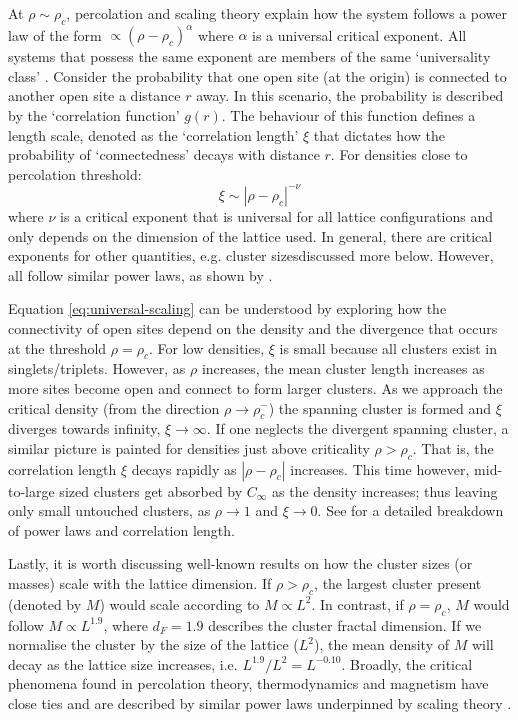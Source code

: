 At $\rho \sim \rho_c$, percolation and scaling theory explain how the system follows a power law of the form $\propto (\rho - \rho_c)^{\alpha}$ 
where $\alpha$ is a universal critical exponent.
All systems that possess the same exponent are members of the same `universality class' \cite{PhysRev.180.594, RevModPhys.76.663}.
Consider the probability that one open site (at the origin) is connected to another open site a distance $r$ away. 
In this scenario, the probability is described by the `correlation function' $g(r)$. 
The behaviour of this function defines a length scale, denoted as the `correlation length' $\xi$ that dictates how the probability of `connectedness' decays with distance $r$. 
For densities close to percolation threshold: 
\begin{equation}
    \xi \sim |\rho - \rho_c|^{-\nu}
    \label{eq:universal-scaling}
\end{equation}
where $\nu$ is a critical exponent that is universal for all lattice configurations and only depends on the dimension of the lattice used. In general, there are critical exponents for other quantities, e.g. cluster sizes\textemdash discussed more below. 
However, all follow similar power laws, as shown by \cite{stauffer2018introduction, STAUFFER19791}.

Equation \ref{eq:universal-scaling} can be understood by exploring how the connectivity of open sites depend on the density and the divergence that occurs at the threshold $\rho=\rho_c$. 
For low densities, $\xi$ is small because all clusters exist in singlets/triplets.
However, as $\rho$ increases, the mean cluster length increases as more sites become open and connect to form larger clusters. 
As we approach the critical density (from the direction $\rho \rightarrow \rho_c^{-}$) the spanning cluster is formed and $\xi$ diverges towards infinity, $\xi \rightarrow \infty$. 
If one neglects the divergent spanning cluster, a similar picture is painted for densities just above criticality $\rho > \rho_c$. 
That is, the correlation length $\xi$ decays rapidly as $|\rho - \rho_c|$ increases. 
This time however,  mid-to-large sized clusters get absorbed by $C_\infty$ as the density increases;
thus leaving only small untouched clusters, as $\rho \rightarrow 1$ and $\xi \rightarrow 0 $. 
See \cite{STAUFFER19791} for a detailed breakdown of power laws and correlation length.

Lastly, it is worth discussing well-known results on how the cluster sizes (or masses) scale with the lattice dimension. 
If $\rho > \rho_c$, the largest cluster present (denoted by $M$) would scale according to $M\propto L^{2}$. 
In contrast, if $\rho = \rho_c$, $M$ would follow $M\propto L^{1.9}$, 
where $d_F=1.9$ describes the cluster fractal dimension.
If we normalise the cluster by the size of the lattice ($L^2$), the mean density of $M$ will decay as the lattice size increases, i.e. $L^{1.9}/L^2 = L^{-0.10}$. 
Broadly, the critical phenomena found in percolation theory, thermodynamics and magnetism have close ties and are described by similar power laws underpinned by scaling theory \cite{Essam_1980}.


